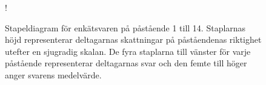 \begin{figure}[hbtp]
    \centering
    \resizebox {\textwidth} {!} {
        
    }
    \caption{Stapeldiagram för enkätsvaren på påstående 1 till 14. Staplarnas höjd representerar deltagarnas skattningar på påståendenas riktighet utefter en sjugradig skalan. De fyra staplarna till vänster för varje påstående representerar deltagarnas svar och den femte till höger anger svarens medelvärde.}
    \label{fig:form_answers}
\end{figure}